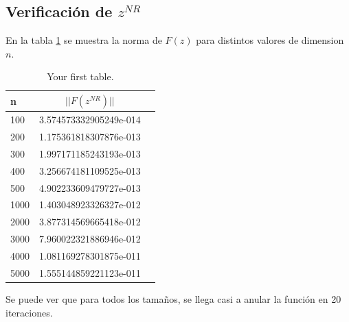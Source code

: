 \documentclass{endm}
\begin{document}
\subsection{Verificación de $z^{NR}$}
En la tabla \ref{tab:table_5_2} se muestra la norma de $F(z)$ para distintos valores de dimension $n$.
\begin{table}[h!]
    \begin{center}
      \caption{Your first table.}
      \label{tab:table_5_2}
      \begin{tabular}{l|c|r} %
        \textbf{n} & \textbf{$||F(z^{NR})||$}\\
        \hline
         100 & 3.574573332905249e-014\\
         200 & 1.175361818307876e-013\\
         300 & 1.997171185243193e-013\\
         400 & 3.256674181109525e-013\\
         500 & 4.902233609479727e-013\\
        1000 & 1.403048923326327e-012\\
        2000 & 3.877314569665418e-012\\
        3000 & 7.960022321886946e-012\\
        4000 & 1.081169278301875e-011\\
        5000 & 1.555144859221123e-011\\
        \hline
      \end{tabular}
    \end{center}
  \end{table}  
Se puede ver que para todos los tamaños, se llega casi a anular la función en 20 iteraciones.

\end{document}
